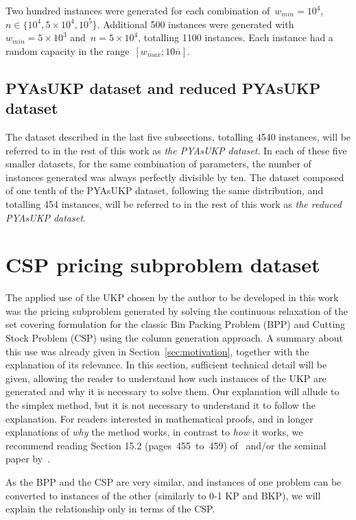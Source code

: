 Two hundred instances were generated for each combination of~\(w_{min} = 10^4\),~\(n \in \{10^4, 5\times10^4, 10^5\}\).
Additional 500 instances were generated with~\(w_{min} = 5\times10^3\) and~\(n = 5\times10^4\), totalling 1100 instances.
Each instance had a random capacity in the range~\([w_{max}; 10\overline{n}]\).

\subsection{PYAsUKP dataset and reduced PYAsUKP dataset}
\label{sec:pya_dat_red_pya_dat}

The dataset described in the last five subsections, totalling 4540 instances, will be referred to in the rest of this work as \emph{the PYAsUKP dataset}.
In each of these five smaller datasets, for the same combination of parameters, the number of instances generated was always perfectly divisible by ten.
The dataset composed of one tenth of the PYAsUKP dataset, following the same distribution, and totalling 454 instances, will be referred to in the rest of this work as \emph{the reduced PYAsUKP dataset}.

\section{CSP pricing subproblem dataset}
\label{sec:csp_ukp_inst}

The applied use of the UKP chosen by the author to be developed in this work was the pricing subproblem generated by solving the continuous relaxation of the set covering formulation for the classic Bin Packing Problem (BPP) and Cutting Stock Problem (CSP) using the column generation approach.
A summary about this use was already given in Section~\ref{sec:motivation}, together with the explanation of its relevance.
In this section, sufficient technical detail will be given, allowing the reader to understand how such instances of the UKP are generated and why it is necessary to solve them.
Our explanation will allude to the simplex method, but it is not necessary to understand it to follow the explanation.
For readers interested in mathematical proofs, and in longer explanations of \emph{why} the method works, in contrast to \emph{how} it works, we recommend reading Section 15.2 (pages~455~to~459) of~\cite{book_ukp_2004} and/or the seminal paper by~\cite{gg-61}.

As the BPP and the CSP are very similar, and instances of one problem can be converted to instances of the other (similarly to 0-1 KP and BKP), we will explain the relationship only in terms of the CSP.

